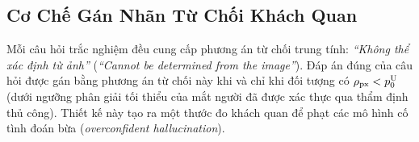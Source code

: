 \subsection{Cơ Chế Gán Nhãn Từ Chối Khách Quan}
Mỗi câu hỏi trắc nghiệm đều cung cấp phương án từ chối trung tính: \textit{``Không thể xác định từ ảnh''} (\textit{``Cannot be determined from the image''}). Đáp án đúng của câu hỏi được gán bằng phương án từ chối này khi và chỉ khi đối tượng có $\rho_{\mathrm{px}} < p_0^{\mathrm{U}}$ (dưới ngưỡng phân giải tối thiểu của mắt người đã được xác thực qua thẩm định thủ công). Thiết kế này tạo ra một thước đo khách quan để phạt các mô hình cố tình đoán bừa (\textit{overconfident hallucination}).

